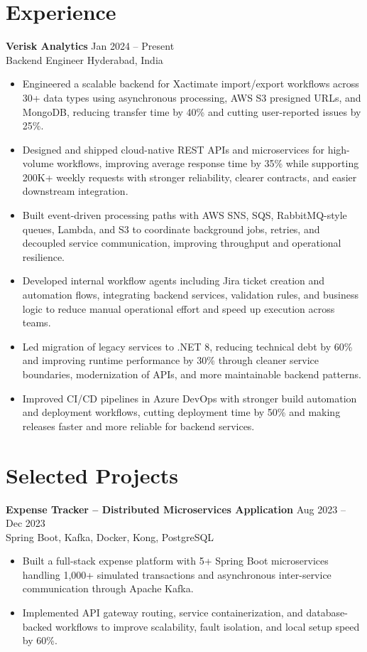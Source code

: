 \documentclass[10pt,letterpaper]{article}
\newcommand{\resumeSubheading}[4]{%
  \textbf{#1} \hfill #2 \\
  #3 \hfill #4 \\
}
\begin{document}
\section*{Experience}
\resumeSubheading{Verisk Analytics}{Jan 2024 -- Present}{Backend Engineer}{Hyderabad, India}
\begin{itemize}
    \item Engineered a scalable backend for Xactimate import/export workflows across 30+ data types using asynchronous processing, AWS S3 presigned URLs, and MongoDB, reducing transfer time by 40\% and cutting user-reported issues by 25\%.
    \item Designed and shipped cloud-native REST APIs and microservices for high-volume workflows, improving average response time by 35\% while supporting 200K+ weekly requests with stronger reliability, clearer contracts, and easier downstream integration.
    \item Built event-driven processing paths with AWS SNS, SQS, RabbitMQ-style queues, Lambda, and S3 to coordinate background jobs, retries, and decoupled service communication, improving throughput and operational resilience.
    \item Developed internal workflow agents including Jira ticket creation and automation flows, integrating backend services, validation rules, and business logic to reduce manual operational effort and speed up execution across teams.
    \item Led migration of legacy services to .NET 8, reducing technical debt by 60\% and improving runtime performance by 30\% through cleaner service boundaries, modernization of APIs, and more maintainable backend patterns.
    \item Improved CI/CD pipelines in Azure DevOps with stronger build automation and deployment workflows, cutting deployment time by 50\% and making releases faster and more reliable for backend services.
\end{itemize}

\section*{Selected Projects}
\resumeSubheading{Expense Tracker -- Distributed Microservices Application}{Aug 2023 -- Dec 2023}{}{Spring Boot, Kafka, Docker, Kong, PostgreSQL}
\begin{itemize}
    \item Built a full-stack expense platform with 5+ Spring Boot microservices handling 1,000+ simulated transactions and asynchronous inter-service communication through Apache Kafka.
    \item Implemented API gateway routing, service containerization, and database-backed workflows to improve scalability, fault isolation, and local setup speed by 60\%.
\end{itemize}
\end{document}
